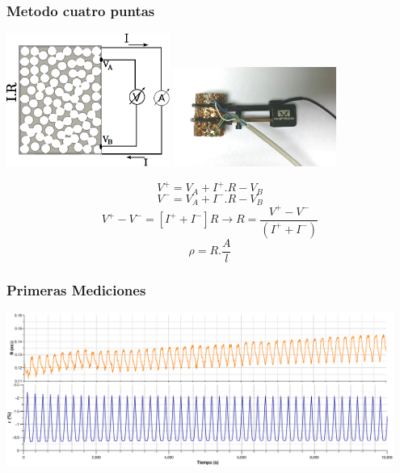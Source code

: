 \documentclass[usenames,dvipsnames]{beamer}
\begin{document}
\begin{frame}
\frametitle{Metodo cuatro puntas}

\includegraphics[width=0.4\textwidth]{img/resistencia/CuatroPuntas1.eps}
\includegraphics[width=0.4\textwidth]{img/resistencia/cpfoto.png}

\begin{equation*}
V^+= V_A +I^+ . R - V_B 
\end{equation*}
\begin{equation*}
 V^-= V_A +I^- . R - V_B 
\end{equation*}
\begin{equation*}
 V^+ - V^-= [I^+ + I^-] R \longrightarrow R=\frac{V^+ - V^-}{(I^+ + I^-)}
\end{equation*}
\begin{equation*}
 \rho = R . \frac{A}{l} \label{resist} 
\end{equation*}


\end{frame}



\begin{frame}
 
  \frametitle{Primeras Mediciones}
  \includegraphics[width=0.95\textwidth]{img/resistencia/Ciclos.eps}

\end{frame}
\end{document}
